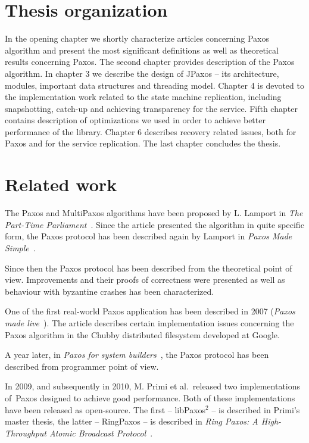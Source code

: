 \section{Thesis organization}

In the opening chapter we shortly characterize articles concerning Paxos algorithm and present the most significant definitions as well as theoretical results concerning Paxos.
The second chapter provides description of the Paxos algorithm.
In chapter 3 we describe the design of JPaxos -- its architecture, modules, important data structures and threading model.
Chapter 4 is devoted to the implementation work related to the state machine replication, including snapshotting, catch-up and achieving transparency for the service.
Fifth chapter contains description of optimizations we used in order to achieve better performance of the library.
Chapter 6 describes recovery related issues, both for Paxos and for the service replication.
The last chapter concludes the thesis.

\section{Related work}

The Paxos and MultiPaxos algorithms have been proposed by L. Lamport in \textit{The Part-Time Parliament}~\cite{Lam98}. Since the article presented the algorithm in quite specific form, the Paxos protocol has been described again by Lamport in \textit{Paxos Made Simple}~\cite{Lam01}.

Since then the Paxos protocol has been described from the theoretical point of view. Improvements and their proofs of correctness were presented as well as behaviour with byzantine crashes has been characterized.

One of the first real-world Paxos application has been described in 2007 (\textit{Paxos made live}~\cite{CGR07}). The article describes certain implementation issues concerning the Paxos algorithm in the Chubby distributed filesystem developed at Google.

A year later, in \textit{Paxos for system builders}~\cite{AK08}, the Paxos protocol has been described from programmer point of view.

In 2009, and subsequently in 2010, M. Primi et al.\ released two implementations of~Paxos designed to achieve good performance. Both of these implementations have been released as open-source. The first -- libPaxos$^2$ -- is described in Primi's master thesis, the latter -- RingPaxos -- is described in \textit{Ring Paxos: A High-Throughput Atomic Broadcast Protocol}~\cite{Mar10}.


